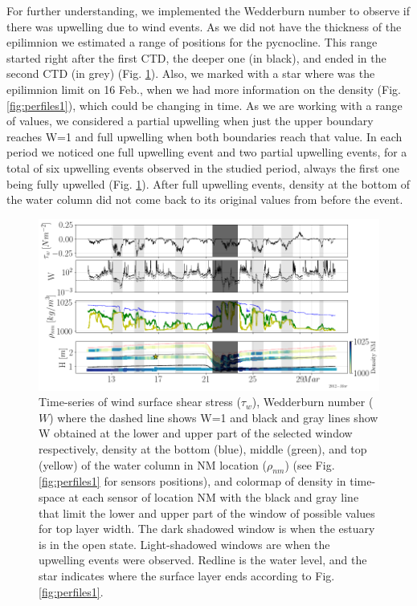 \documentclass[tesis.tex]{subfiles}
\begin{document}
For further understanding, we implemented the Wedderburn number to observe if there was upwelling due to wind events. As we did not have the thickness of the epilimnion we estimated a range of positions for the pycnocline. This range started right after the first CTD, the deeper one (in black), and ended in the second CTD (in grey) (Fig. \ref{fig:wedd}). Also, we marked with a star where was the epilimnion limit on 16 Feb., when we had more information on the density (Fig. \ref{fig:perfiles1}), which could be changing in time. As we are working with a range of values, we considered a partial upwelling when just the upper boundary reaches W=1 and full upwelling when both boundaries reach that value. In each period we noticed one full upwelling event and two partial upwelling events, for a total of six upwelling events observed in the studied period, always the first one being fully upwelled (Fig. \ref{fig:wedd}). After full upwelling events, density at the bottom of the water column did not come back to its original values from before the event. \\

\begin{figure}[h!]
    \centering
    \includegraphics[width=\textwidth]{Imagenes/wedd.png}
    \caption{Time-series of wind surface shear stress ($\tau_w$), Wedderburn number ($W$) where the dashed line shows W=1 and black and gray lines show W obtained at the lower and upper part of the selected window respectively, density at the bottom (blue), middle (green), and top (yellow) of the water column in NM location ($\rho_{nm}$) (see Fig. \ref{fig:perfiles1} for sensors positions), and colormap of density in time-space at each sensor of location NM with the black and gray line that limit the lower and upper part of the window of possible values for top layer width. The dark shadowed window is when the estuary is in the open state. Light-shadowed windows are when the upwelling events were observed. Redline is the water level, and the star indicates where the surface layer ends according to Fig. \ref{fig:perfiles1}.}
    \label{fig:wedd}
\end{figure}
\end{document}
